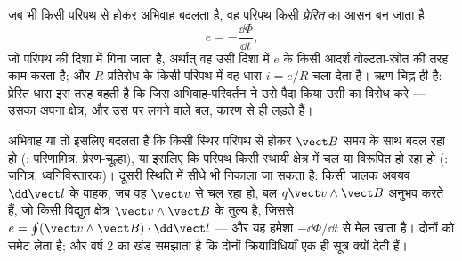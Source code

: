 \begin{theorem}[फ़ैराडे का प्रेरण-नियम]\label{thm:b1:induction:faraday}
जब भी किसी परिपथ से होकर अभिवाह बदलता है, वह परिपथ किसी
\emph{प्रेरित } का आसन बन जाता है
\[
e = -\frac{\dd\Phi}{\dd t} ,
\]
जो परिपथ की दिशा में गिना जाता है, अर्थात् वह उसी दिशा में 
$e$ के किसी आदर्श वोल्टता-स्रोत की तरह काम करता है; और $R$ प्रतिरोध के किसी
परिपथ में वह धारा $i = e/R$ चला देता है। ऋण चिह्न ही \emph{}
है: प्रेरित धारा इस तरह बहती है कि जिस अभिवाह-परिवर्तन ने उसे पैदा किया उसी
का विरोध करे --- उसका अपना क्षेत्र, और उस पर लगने वाले बल, कारण से ही लड़ते हैं।
\end{theorem}
\admitted

\begin{remark}[एक ही नियम के दो रूप]\label{rem:b1:induction:twofaces}
अभिवाह या तो इसलिए बदलता है कि किसी स्थिर परिपथ से होकर $\vect B$ समय के
साथ बदल रहा हो (\emph{}: परिणामित्र, प्रेरण-चूल्हा), या इसलिए
कि परिपथ किसी स्थायी क्षेत्र में चल या विरूपित हो रहा हो
(\emph{}: जनित्र, ध्वनिविस्तारक)। दूसरी स्थिति में  सीधे भी निकाला जा सकता है: किसी चालक अवयव $\dd\vect l$ के वाहक, जब
वह $\vect v$ से चल रहा हो, बल $q\vect v\wedge
\vect B$ अनुभव करते हैं, जो किसी विद्युत क्षेत्र $\vect v\wedge\vect B$ के
तुल्य है, जिससे $e = \oint(\vect v\wedge\vect B)\cdot\dd\vect l$ --- और यह
हमेशा $-\dd\Phi/\dd t$ से मेल खाता है।  दोनों को समेट लेता है;
और वर्ष 2 का खंड समझाता है कि दोनों क्रियाविधियाँ एक ही सूत्र क्यों देती हैं।
\end{remark}

